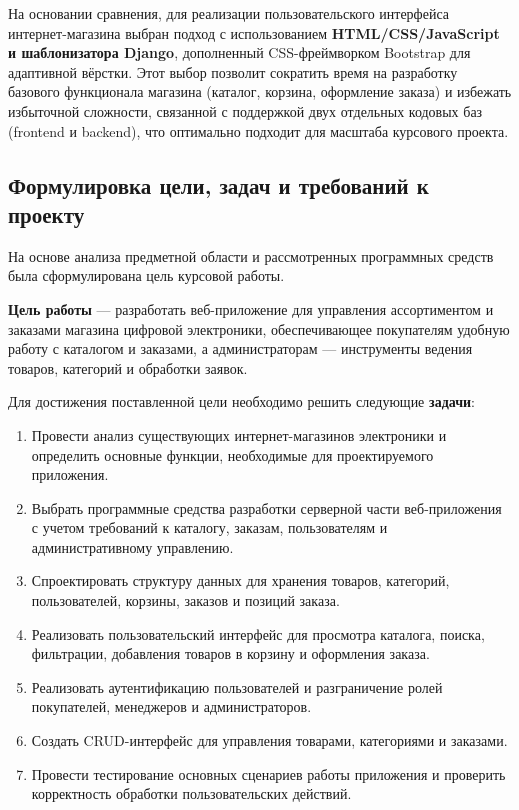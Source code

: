 На основании сравнения, для реализации пользовательского интерфейса интернет-магазина выбран подход с использованием \textbf{HTML/CSS/JavaScript и шаблонизатора Django}, дополненный CSS-фреймворком Bootstrap для адаптивной вёрстки. Этот выбор позволит сократить время на разработку базового функционала магазина (каталог, корзина, оформление заказа) и избежать избыточной сложности, связанной с поддержкой двух отдельных кодовых баз (frontend и backend), что оптимально подходит для масштаба курсового проекта.

\subsection{Формулировка цели, задач и требований к проекту}

На основе анализа предметной области и рассмотренных программных средств была сформулирована цель курсовой работы.

\textbf{Цель работы} --- разработать веб-приложение для управления ассортиментом и заказами магазина цифровой электроники, обеспечивающее покупателям удобную работу с каталогом и заказами, а администраторам --- инструменты ведения товаров, категорий и обработки заявок.

Для достижения поставленной цели необходимо решить следующие \textbf{задачи}:
\begin{enumerate}
    \item Провести анализ существующих интернет-магазинов электроники и определить основные функции, необходимые для проектируемого приложения.
    \item Выбрать программные средства разработки серверной части веб-приложения с учетом требований к каталогу, заказам, пользователям и административному управлению.
    \item Спроектировать структуру данных для хранения товаров, категорий, пользователей, корзины, заказов и позиций заказа.
    \item Реализовать пользовательский интерфейс для просмотра каталога, поиска, фильтрации, добавления товаров в корзину и оформления заказа.
    \item Реализовать аутентификацию пользователей и разграничение ролей покупателей, менеджеров и администраторов.
    \item Создать CRUD-интерфейс для управления товарами, категориями и заказами.
    \item Провести тестирование основных сценариев работы приложения и проверить корректность обработки пользовательских действий.
\end{enumerate}

